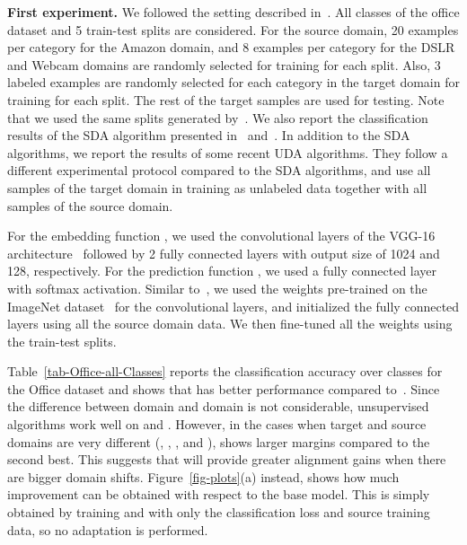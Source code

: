 \noindent \textbf{First experiment.} We followed the setting described in~\cite{tzengHDS15iccv}. All classes of the office dataset and 5 train-test splits are considered. For the source domain, 20 examples per category for the Amazon domain, and 8 examples per category for the DSLR and Webcam domains are randomly selected for training for each split. Also, 3 labeled examples are randomly selected for each category in the
target domain for training for each split. The rest of the target samples are used for testing. Note that we used the same splits generated by~\cite{tzengHDS15iccv}. We also report the classification results of the SDA algorithm presented in~\cite{long2015learning} and~\cite{koniusz2016domain}. In addition to the SDA algorithms, we report the results of some recent UDA algorithms. They follow a different experimental protocol compared to the SDA algorithms, and use all samples of the target domain in training as unlabeled data together with all samples of the source domain. 

\begin{comment}
So, we cannot make an exact comparison between results. However, since UDA algorithms use all samples of the target domain in training and we use only very few of them (3 per class), we think it is still worth looking at how they differ.
\end{comment}

For the embedding function , we used the convolutional layers of the VGG-16 architecture~\cite{Simonyan14c} followed by 2 fully connected layers with output size of 1024 and 128, respectively. For the prediction function , we used a fully connected layer with softmax activation. Similar to~\cite{tzengHDS15iccv}, we used the weights pre-trained on the ImageNet dataset~\cite{imagenet2015} for the convolutional layers, and initialized the fully connected layers using all the source domain data. We then fine-tuned all the weights using the train-test splits.

Table~\ref{tab-Office-all-Classes} reports the classification accuracy over  classes for the Office dataset and shows that \modelDA has better performance compared to~\cite{tzengHDS15iccv}. Since the difference between  domain and  domain is not considerable, unsupervised algorithms work well on  and .   However, in the cases when target and source domains are very different (, , , and ), \modelDA shows larger margins compared to the second best. This suggests that \modelDA will provide greater alignment gains when there are bigger domain shifts. Figure~\ref{fig-plots}(a) instead, shows how much improvement can be obtained with respect to the base model. This is simply obtained by training  and  with only the classification loss and source training data, so no adaptation is performed.


